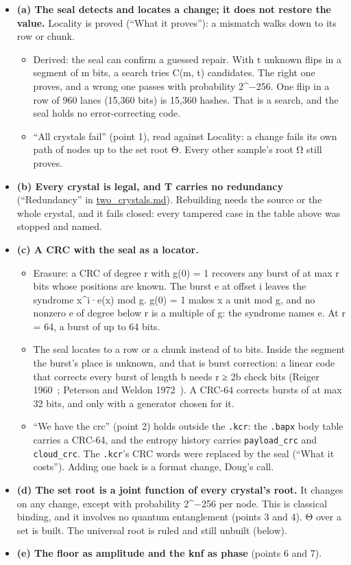 \begin{itemize}
\item \textbf{(a) The seal detects and locates a change; it does not restore the value.} Locality is proved (“What it proves”): a mismatch walks down to its row or chunk.

\begin{itemize}
\item Derived: the seal can confirm a guessed repair. With t unknown flips in a segment of m bits, a search tries C(m, t) candidates. The right one proves, and a wrong one passes with probability 2\textasciicircum{}−256. One flip in a row of 960 lanes (15,360 bits) is 15,360 hashes. That is a search, and the seal holds no error-correcting code.
\item “All crystals fail” (point 1), read against Locality: a change fails its own path of nodes up to the set root Θ. Every other sample's root Ω still proves.
\end{itemize}
\item \textbf{(b) Every crystal is legal, and T carries no redundancy} (“Redundancy” in \hyperref[chap:two-crystals]{two\_\allowbreak{}crystals.md}). Rebuilding needs the source or the whole crystal, and it fails closed: every tampered case in the table above was stopped and named.
\item \textbf{(c) A CRC with the seal as a locator.}

\begin{itemize}
\item Erasure: a CRC of degree r with g(0) = 1 recovers any burst of at max r bits whose positions are known. The burst e at offset i leaves the syndrome x\textasciicircum{}i·e(x) mod g. g(0) = 1 makes x a unit mod g, and no nonzero e of degree below r is a multiple of g: the syndrome names e. At r = 64, a burst of up to 64 bits.
\item The seal locates to a row or a chunk instead of to bits. Inside the segment the burst's place is unknown, and that is burst correction: a linear code that corrects every burst of length b needs r ≥ 2b check bits (Reiger 1960~\cite{src:Reiger-1960}; Peterson and Weldon 1972~\cite{src:Peterson-and-Weldon-1972}). A CRC-64 corrects bursts of at max 32 bits, and only with a generator chosen for it.
\item “We have the crc” (point 2) holds outside the \texttt{.\allowbreak{}kcr}: the \texttt{.\allowbreak{}bapx} body table carries a CRC-64, and the entropy history carries \texttt{payload\_\allowbreak{}crc} and \texttt{cloud\_\allowbreak{}crc}. The \texttt{.\allowbreak{}kcr}'s CRC words were replaced by the seal (“What it costs”). Adding one back is a format change, Doug's call.
\end{itemize}
\item \textbf{(d) The set root is a joint function of every crystal's root.} It changes on any change, except with probability 2\textasciicircum{}−256 per node. This is classical binding, and it involves no quantum entanglement (points 3 and 4). Θ over a set is built. The universal root is ruled and still unbuilt (below).
\item \textbf{(e) The floor as amplitude and the knf as phase} (points 6 and 7).


\end{itemize}

